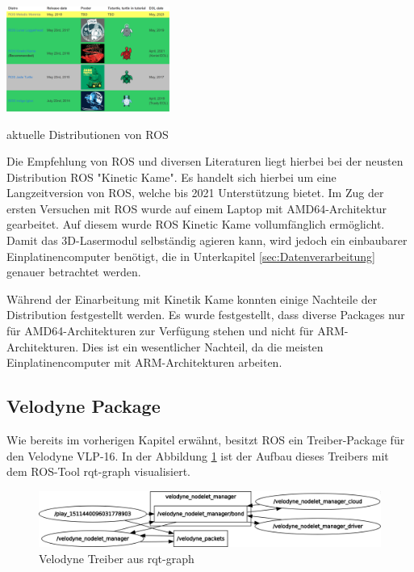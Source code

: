 \begin{table}[H]
	\centering
	\includegraphics[width=0.4\textwidth]{resources/rosdistos.PNG}
	\caption[aktuelle Distributionen von ROS]{aktuelle Distributionen von ROS {\cite{ROSprojects}}}
	\label{fig:rosdistros}
\end{table} 

Die Empfehlung von ROS und diversen Literaturen liegt hierbei bei der neusten Distribution ROS "Kinetic Kame". \cite{ROSprojects} Es handelt sich hierbei um eine Langzeitversion von ROS, welche bis 2021 Unterstützung bietet. Im Zug der ersten Versuchen mit ROS wurde auf einem Laptop mit AMD64-Architektur gearbeitet. Auf diesem wurde ROS Kinetic Kame vollumfänglich ermöglicht. Damit das 3D-Lasermodul selbständig agieren kann, wird jedoch ein einbaubarer Einplatinencomputer benötigt, die in Unterkapitel \ref{sec:Datenverarbeitung} genauer betrachtet werden. 

Während der Einarbeitung mit Kinetik Kame konnten einige Nachteile der Distribution festgestellt werden. Es wurde festgestellt, dass diverse Packages nur für \ac{AMD64}-Architekturen zur Verfügung stehen und nicht für \ac{ARM}-Architekturen. Dies ist ein wesentlicher Nachteil, da die meisten Einplatinencomputer mit \ac{ARM}-Architekturen arbeiten.

\subsection{Velodyne Package}
Wie bereits im vorherigen Kapitel erwähnt, besitzt ROS ein Treiber-Package für den Velodyne VLP-16. In der Abbildung \ref{fig:rosgraph} ist der Aufbau dieses Treibers mit dem ROS-Tool rqt-graph visualisiert. 

\begin{figure}[H]
	\centering
	\includegraphics[width=1\textwidth]{resources/rosgraph.png}
	\caption[Velodyne Treiber aus rqt-graph ]{Velodyne Treiber aus rqt-graph}
	\label{fig:rosgraph}
\end{figure} 

